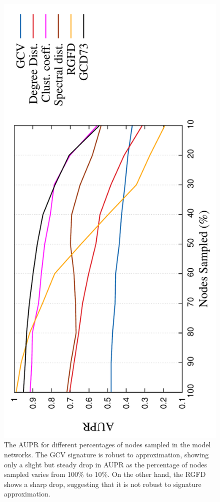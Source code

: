 \begin{figure}[H]
  \hspace{-1.5em}
  \includegraphics[scale=0.7, angle=-90]
  {../code/final_results/trade_2010_thresholded/eval_results/sampl_aupr_all_sigs2.pdf}
  \caption[The AUPR for different percentages of nodes sampled in the model networks]{The AUPR for different percentages of nodes sampled in the model networks. The GCV signature is robust to approximation, showing only a slight but steady drop in AUPR as the percentage of nodes sampled varies from 100\% to 10\%. On the other hand, the RGFD shows a sharp drop, suggesting that it is not robust to signature approximation.}
  \label{fig:sampl_aupr}
\end{figure}

